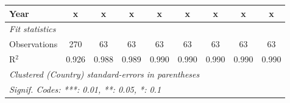 \begin{table}[htbp]
\begin{tabular}{lcccccccc}
      Year                                                      & x              & x       & x       & x             & x             & x             & x             & x\\  
      \midrule \emph{Fit statistics}\\
      Observations                                              & 270            & 63      & 63      & 63            & 63            & 63            & 63            & 63\\  
      R$^2$                                                     & 0.926          & 0.988   & 0.989   & 0.990         & 0.990         & 0.990         & 0.990         & 0.990\\  
      \midrule
      \multicolumn{9}{l}{\emph{Clustered (Country) standard-errors in parentheses}}\\
      \multicolumn{9}{l}{\emph{Signif. Codes: ***: 0.01, **: 0.05, *: 0.1}}\\
   \end{tabular}
\end{table}


